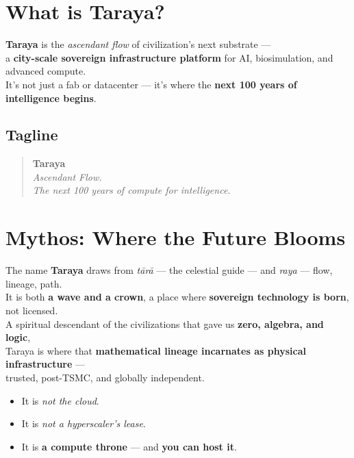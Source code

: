 \documentclass{article}
\begin{document}
  \section*{What is Taraya?}

  \textbf{Taraya} is the \textit{ascendant flow} of civilization's next substrate --- \\
  a \textbf{city-scale sovereign infrastructure platform} for AI, biosimulation, and advanced compute. \\
  It’s not just a fab or datacenter — it’s where the \textbf{next 100 years of intelligence begins}.

  \vspace{1em}

  \subsection*{Tagline}
  \begin{quote}
    \textbf{Taraya} \\
    \textit{Ascendant Flow.} \\
    \textit{The next 100 years of compute for intelligence.}
  \end{quote}

  \vspace{1em}

  \section*{Mythos: Where the Future Blooms}

  The name \textbf{Taraya} draws from \textit{tārā} — the celestial guide — and \textit{raya} — flow, lineage, path. \\
  It is both \textbf{a wave and a crown}, a place where \textbf{sovereign technology is born}, not licensed. \\
  A spiritual descendant of the civilizations that gave us \textbf{zero, algebra, and logic}, \\
  Taraya is where that \textbf{mathematical lineage incarnates as physical infrastructure} — \\
  trusted, post-TSMC, and globally independent.

  \begin{itemize}
    \item It is \textit{not the cloud}.
    \item It is \textit{not a hyperscaler’s lease}.
    \item It is \textbf{a compute throne} — and \textbf{you can host it}.
  \end{itemize}
\end{document}

